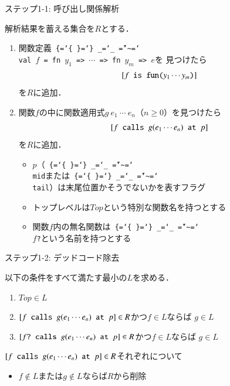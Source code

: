 \documentclass[aspectratio=169,t,dvipdfmx,12pt]{beamer}
\newcommand\codestyle{%
  \ttfamily
  \chardef\{=`\{
  \chardef\}=`\}
  \chardef\_=`\_
  \chardef\~=`\~
  \chardef\/=`\\
  \frenchspacing}
\newcommand\code[1]{\texttt{\protect\codestyle #1}}
\begin{document}
\begin{frame}{ステップ1-1: 呼び出し関係解析}

解析結果を蓄える集合を$R$とする．
\begin{enumerate}
\item 関数定義\code{val $f$ = fn $y_1$ => $\cdots$ => fn $y_m$ => $e$}を
見つけたら
\[[\code{$f$ is fun($y_1\cdots y_m$)}]\]
を$R$に追加．
\medskip
\item 関数$f$の中に関数適用式$g\ e_1\ \cdots\ e_n$（$n \ge 0$）を見つけたら
\[[\code{$f$ calls $g(e_1\cdots e_n)$ at $p$}]\]
を$R$に追加．
\begin{itemize}
\item $p$（\code{mid}または\code{tail}）は末尾位置かそうでないかを表すフラグ
\item トップレベルは$\mathit{Top}$という特別な関数名を持つとする
\item 関数$f$内の無名関数は\code{$f$?}という名前を持つとする
\end{itemize}
\end{enumerate}

\end{frame}

\begin{frame}{ステップ1-2: デッドコード除去}

以下の条件をすべて満たす最小の$L$を求める．
\begin{enumerate}
\item $\mathit{Top} \in L$
\item $[\code{$f$ calls $g(e_1\cdots e_n)$ at $p$}] \in R$かつ$f \in L$ならば
$g\in L$
\item $[\code{$f$? calls $g(e_1\cdots e_n)$ at $p$}] \in R$かつ$f \in L$ならば
$g\in L$
\end{enumerate}

\bigskip
$[\code{$f$ calls $g(e_1\cdots e_n)$ at $p$}] \in R$それぞれについて
\begin{itemize}
\item $f\not\in L$または$g\not\in L$ならば$R$から削除
\end{itemize}

\end{frame}
\end{document}
